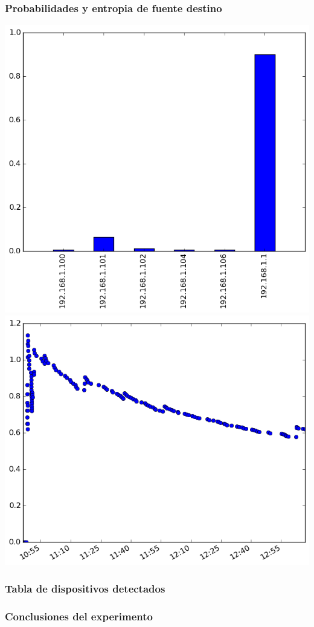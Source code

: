 \subsubsection{Probabilidades y entropia de fuente destino}
\includegraphics[scale=0.33]{../experimentacion-svilerino/casa/histogram_dst_probabilities.png}
\includegraphics[scale=0.33]{../experimentacion-svilerino/casa/entropy_dst.png}

\subsubsection{Tabla de dispositivos detectados}


\subsubsection{Conclusiones del experimento}